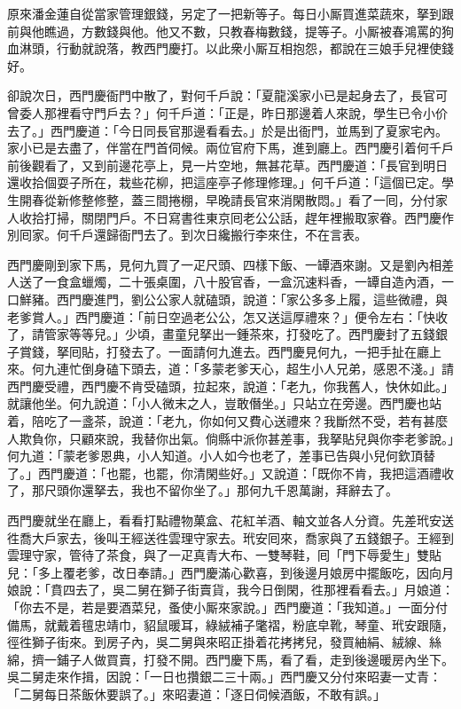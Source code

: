 原來潘金蓮自從當家管理銀錢，另定了一把新等子。每日小厮買進菜蔬來，拏到跟前與他瞧過，方數錢與他。{}他又不數，只教春梅數錢，提等子。小厮被春鴻罵的狗血淋頭，行動就說落，教西門慶打。以此衆小厮互相抱怨，都說在三娘手兒裡使錢好。

卻說次日，西門慶衙門中散了，對何千戶說：「夏龍溪家小已是起身去了，長官可曾委人那裡看守門戶去？」何千戶道：「正是，昨日那邊着人來說，學生已令小价去了。」西門慶道：「今日同長官那邊看看去。」於是出衙門，並馬到了夏家宅內。家小已是去盡了，伴當在門首伺候。兩位官府下馬，進到廳上。西門慶引着何千戶前後觀看了，又到前邊花亭上，見一片空地，無甚花草。西門慶道：「長官到明日還收拾個耍子所在，栽些花柳，把這座亭子修理修理。」何千戶道：「這個已定。學生開春從新修整修整，蓋三間捲棚，早晚請長官來消閑散悶。」看了一囘，分付家人收拾打掃，關閉門戶。不日寫書徃東京囘老公公話，趕年裡搬取家眷。西門慶作別囘家。何千戶還歸衙門去了。到次日纔搬行李來住，不在言表。

西門慶剛到家下馬，見何九買了一疋尺頭、四樣下飯、一罈酒來謝。又是劉內相差人送了一食盒蠟燭，二十張桌圍，八十股官香，一盒沉速料香，一罈自造內酒，一口鮮豬。西門慶進門，劉公公家人就磕頭，說道：「家公多多上履，這些微禮，與老爹賞人。」西門慶道：「前日空過老公公，怎又送這厚禮來？」便令左右：「快收了，請管家等等兒。」少頃，畫童兒拏出一鍾茶來，打發吃了。西門慶封了五錢銀子賞錢，拏囘貼，打發去了。一面請何九進去。西門慶見何九，一把手扯在廳上來。何九連忙倒身磕下頭去，道：「多蒙老爹天心，超生小人兄弟，感恩不淺。」請西門慶受禮，西門慶不肯受磕頭，拉起來，說道：「老九，你我舊人，快休如此。」就讓他坐。何九說道：「小人微末之人，豈敢僭坐。」只站立在旁邊。西門慶也站着，陪吃了一盞茶，說道：「老九，你如何又費心送禮來？我斷然不受，若有甚麼人欺負你，只顧來說，我替你出氣。倘縣中派你甚差事，我拏貼兒與你李老爹說。」何九道：「蒙老爹恩典，小人知道。小人如今也老了，差事已告與小兒何欽頂替了。」西門慶道：「也罷，也罷，你清閑些好。」又說道：「既你不肯，我把這酒禮收了，那尺頭你還拏去，我也不留你坐了。」那何九千恩萬謝，拜辭去了。

西門慶就坐在廳上，看看打點禮物菓盒、花紅羊酒、軸文並各人分資。先差玳安送徃喬大戶家去，後叫王經送徃雲理守家去。玳安囘來，喬家與了五錢銀子。王經到雲理守家，管待了茶食，與了一疋真青大布、一雙琴鞋，囘「門下辱愛生」雙貼兒：「多上覆老爹，改日奉請。」西門慶滿心歡喜，到後邊月娘房中擺飯吃，因向月娘說：「賁四去了，吳二舅在獅子街賣貨，我今日倒閑，徃那裡看看去。」月娘道：「你去不是，若是要酒菜兒，蚤使小厮來家說。」西門慶道：「我知道。」一面分付備馬，就戴着氊忠靖巾，貂鼠暖耳，綠絨補子氅褶，粉底皁靴，琴童、玳安跟隨，徑徃獅子街來。到房子內，吳二舅與來昭正掛着花拷拷兒，發買紬絹、絨線、絲綿，擠一鋪子人做買賣，打發不開。西門慶下馬，看了看，走到後邊暖房內坐下。吳二舅走來作揖，因說：「一日也攢銀二三十兩。」西門慶又分付來昭妻一丈青：「二舅每日茶飯休要誤了。」來昭妻道：「逐日伺候酒飯，不敢有誤。」

